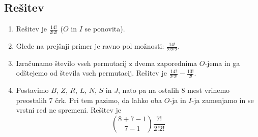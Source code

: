 \documentclass[11pt]{article}
\begin{document}
\subsection*{Rešitev}
\begin{enumerate}[label=(\alph*)]
    \item Rešitev je \(\frac{14!}{2!2!}\) (\(O\) in \(I\) se ponovita).
    \item Glede na prejšnji primer je ravno pol možnosti: \(\frac{14!}{2!2!2}\).
    \item Izračunamo število vseh permutacij z dvema zaporednima \(O\)-jema in ga odštejemo od števila vseh permutacij. Rešitev je
        \(\frac{14!}{2!2!} - \frac{13!}{2!}\).
    \item Postavimo \(B\), \(Z\), \(R\), \(L\), \(N\), \(S\) in \(J\), nato pa na ostalih 8 mest vrinemo preostalih 7 črk. 
    Pri tem pazimo, da lahko oba \(O\)-ja in \(I\)-ja zamenjamo in se vrstni red ne spremeni. Rešitev je
        \[\binom{8 + 7 - 1}{7 - 1} \frac{7!}{2!2!}\]
\end{enumerate}
\end{document}

